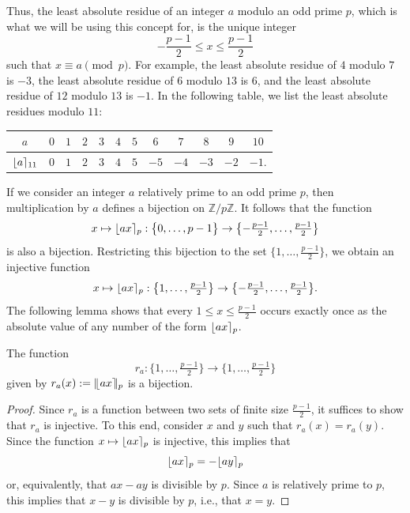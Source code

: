 Thus, the least absolute residue of an integer $a$ modulo an odd prime $p$, which is what we will be using this concept for, is the unique integer
\begin{equation*}
  -\frac{p-1}{2}\leq x\leq \frac{p-1}{2}
\end{equation*}
such that $x\equiv a\pmod{p}$. For example, the least absolute residue of $4$ modulo $7$ is $-3$, the least absolute residue of $6$ modulo $13$ is $6$, and the least absolute residue of $12$ modulo $13$ is $-1$. In the following table, we list the least absolute residues modulo $11$:
\begin{center}
  \begin{tabular}{c|ccccccccccc}
    $a$ & $0$ & $1$ & $2$ & $3$ &  $4$ & $5$ & $6$ & $7$ & $8$ & $9$ & $10$ \\ \midrule
    $\lfloor a \rceil_{11}$ & $0$ & $1$ & $2$ & $3$ &  $4$ & $5$ & $-5$ & $-4$ & $-3$ & $-2$ & $-1$.
  \end{tabular}
\end{center}

If we consider an integer $a$ relatively prime to an odd prime $p$, then multiplication by $a$ defines a bijection on $\mathbb{Z}/p\mathbb{Z}$. It follows that the function
\begin{equation*}
  x\mapsto \lfloor ax \rceil_{p} : \bigl\{0,\ldots,p-1\bigr\}\to\bigl\{-\tfrac{p-1}{2},\ldots,\tfrac{p-1}{2}\bigr\}
\end{equation*}
is also a bijection. Restricting this bijection to the set $\{1,\ldots,\frac{p-1}{2}\}$, we obtain an injective function
\begin{equation*}
  x\mapsto \lfloor ax \rceil_{p} :\bigl\{1,\ldots,\tfrac{p-1}{2}\bigr\}\to\bigl\{-\tfrac{p-1}{2},\ldots,\tfrac{p-1}{2}\bigr\}.
\end{equation*}
The following lemma shows that every $1\leq x\leq\frac{p-1}{2}$ occurs exactly once as the absolute value of any number of the form $\lfloor ax \rceil_{p}$.

\begin{lemma}\label{lemma:bijection-gausss-lemma}
  The function
  \begin{equation*}
    r_a:\bigl\{1,\ldots,\tfrac{p-1}{2}\bigr\}\to\bigl\{1,\ldots,\tfrac{p-1}{2}\bigr\}
  \end{equation*}
  given by $r_a(x):=|\mkern-3mu \lfloor ax \rceil\mkern-3mu |_{p}$ is a bijection.
\end{lemma}

\begin{proof}
  Since $r_a$ is a function between two sets of finite size $\frac{p-1}{2}$, it suffices to show that $r_a$ is injective. To this end, consider $x$ and $y$ such that $r_a(x)=r_a(y)$. Since the function $x\mapsto \lfloor ax \rceil_{p}$ is injective, this implies that
  \begin{equation*}
    \lfloor ax \rceil_{p}=-\lfloor ay \rceil_{p}
  \end{equation*}
  or, equivalently, that $ax-ay$ is divisible by $p$. Since $a$ is relatively prime to $p$, this implies that $x-y$ is divisible by $p$, i.e., that $x=y$.
\end{proof}

